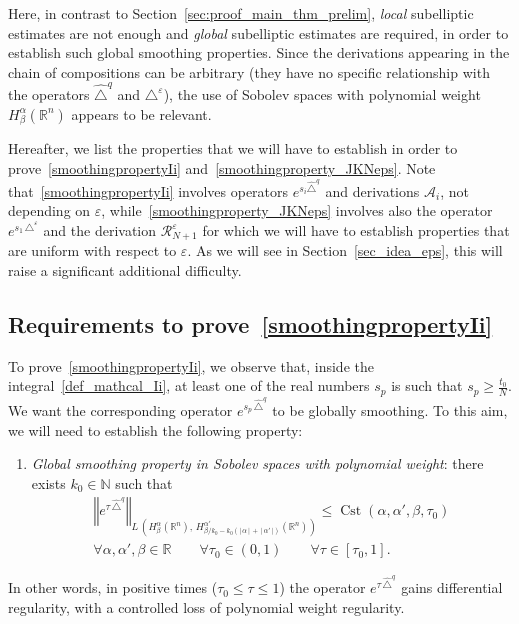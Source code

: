 \documentclass[AHL,Unicode,published]{cedram}
\newcommand*\R{\mathbb{R}}
\newcommand*\N{\mathbb{N}}
\newcommand{\calA}{\mathcal{A}}
\newcommand{\calR}{\mathcal{R}}
\DeclareMathOperator{\Cst}{Cst}
\renewcommand{\geq}{\geqslant}
\renewcommand{\leq}{\leqslant}
\newcommand*{\Penumi}{\renewcommand*{\theenumi}{$\mathbf{P}_\arabic{enumi}$}}
\let\oldforall\forall
\renewcommand*{\forall}{\mathrel{\oldforall}}
\begin{document}
Here, in contrast to Section~\ref{sec:proof_main_thm_prelim}, \emph{local} subelliptic estimates are not enough and \emph{global} subelliptic estimates are required, in order to establish such global smoothing properties. Since the derivations appearing in the chain of compositions can be arbitrary (they have no specific relationship with the operators $\widehat{\triangle}^{q}$ and $\triangle^\varepsilon$), the use of Sobolev spaces with polynomial weight $H^\alpha_\beta(\R^n)$ appears to be relevant.

Hereafter, we list the properties that we will have to establish in order to prove~\eqref{smoothingpropertyIi} and~\eqref{smoothingproperty_JKNeps}. Note that~\eqref{smoothingpropertyIi} involves operators $e^{s_i \widehat{\triangle}^{q}}$ and derivations $\calA_i$, not depending on $\varepsilon$, while~\eqref{smoothingproperty_JKNeps} involves also the operator $e^{s_1\,\triangle^\varepsilon}$ and the derivation $\calR_{N+1}^\varepsilon$ for which we will have to establish properties that are uniform with respect to $\varepsilon$. As we will see in Section~\ref{sec_idea_eps}, this will raise a significant additional difficulty.

\subsection{Requirements to prove~\eqref{smoothingpropertyIi}}\label{sec_idea_nilp}
To prove~\eqref{smoothingpropertyIi}, we observe that, inside the integral~\eqref{def_mathcal_Ii}, at least one of the real numbers $s_p$ is such that $s_p\geq \frac{t_0}{N}$. We want the corresponding operator $e^{s_p\,\widehat{\triangle}^{q}}$ to be globally smoothing. To this aim, we will need to establish the following property:
\begin{enumerate}\Penumi
\item\label{Pglobsmoothing} \emph{Global smoothing property in Sobolev spaces with polynomial weight}: there exists $k_0\in\N$ such that
\begin{multline*}
\left\Vert e^{\tau\,\widehat{\triangle}^{q}}\right\Vert_{L\,\left(H^\alpha_\beta(\R^n),\,H^{\alpha'}_{\beta/k_0-k_0\left(\vert\,\alpha\,\vert\,+\,\vert\,\alpha'\,\vert\right)}(\R^n)\right)} \leq \Cst\left(\alpha,\alpha',\beta,\tau_0\right) \\
\forall \alpha,\alpha',\beta\in\R \qquad \forall \tau_0\in(0,1) \qquad \forall\tau\in[\tau_0,1].
\end{multline*}
\end{enumerate}
In other words, in positive times ($\tau_0\leq\tau\leq1$) the operator $e^{\tau\,\widehat{\triangle}^{q}}$ gains differential regularity, with a controlled loss of polynomial weight regularity.
\end{document}
